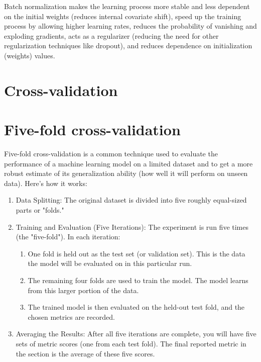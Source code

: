 Batch normalization makes the learning process more stable and less
dependent on the initial weights (reduces internal covariate shift),
speed up the training process by allowing higher learning rates,
reduces the probability of vanishing and exploding gradients, acts as
a regularizer (reducing the need for other regularization techniques
like dropout), and reduces dependence on initialization (weights)
values.

\section{Cross-validation}

\section{Five-fold cross-validation}
Five-fold cross-validation is a common technique used to evaluate the performance of a machine learning model on a limited dataset and to get a more robust estimate of its generalization ability (how well it will perform on unseen data). Here's how it works:

\begin{enumerate}
\item Data Splitting: The original dataset is divided into five roughly equal-sized parts or "folds."

\item Training and Evaluation (Five Iterations): The experiment is run five times (the "five-fold"). In each iteration:
  \begin{enumerate}
  \item One fold is held out as the test set (or validation set). This is the data the model will be evaluated on in this particular run.
  \item The remaining four folds are used to train the model. The model learns from this larger portion of the data.
  \item The trained model is then evaluated on the held-out test fold, and the chosen metrics are recorded.
  \end{enumerate}
\item Averaging the Results: After all five iterations are complete, you will have five sets of metric scores (one from each test fold). The final reported metric in the section is the average of these five scores.
\end{enumerate}

